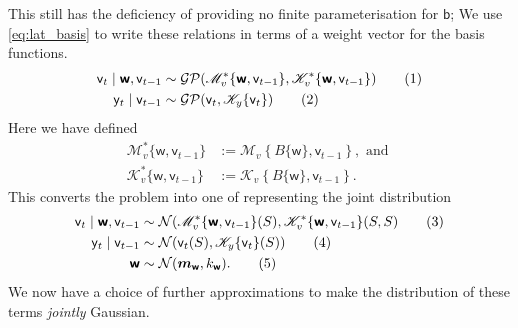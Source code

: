 \documentclass{article}
\newcommand\numberthis{\addtocounter{equation}{1}\tag{\theequation}}
\newcommand{\vv}[1]{\boldsymbol{#1}}
\newcommand{\rv}[1]{\mathsf{#1}}
\newcommand{\vrv}[1]{\vv{\rv{#1}}}
\newcommand{\dist}[1]{\mathcal{#1}}
\newcommand{\set}[1]{#1}
\newcommand{\op}[1]{\mathscr{#1}}
\newcommand{\gvn}{\mid}
\newcommand{\lat}{\rv{b}}   %
\newcommand{\latwt}{\vrv{w}}
\begin{document}

This still has the deficiency of providing no finite parameterisation for \(\lat\); We use \eqref{eq:lat_basis} to write these relations in terms of a weight vector for the basis functions.
\begin{align*}
\rv{v}_{t}\gvn \latwt,\rv{v}_{t-1}
&\sim \dist{GP}(\op{M}^*_v\{\latwt,\rv{v}_{t-1}\},\op{K}^*_{v}\{\latwt,\rv{v}_{t-1}\})\numberthis \label{eq:mvn_approx_proc} \\
\rv{y}_{t}\gvn \rv{v}_{t-1}
&\sim \dist{GP}(\rv{v}_{t},\op{K}_{y}\{\rv{v}_{t}\}) \numberthis \label{eq:mvn_approx_obs} \\
\end{align*}
Here we have defined
\begin{align*}
    \op{M}^*_v\{\latwt,\rv{v}_{t-1}\}&:=\op{M}_v\left\{B\{\latwt\},\rv{v}_{t-1}\right\}, \text{ and }\\ \op{K}^*_v\{\latwt,\rv{v}_{t-1}\}&:=\op{K}_v\left\{B\{\latwt\},\rv{v}_{t-1}\right\}.
\end{align*}
This converts the problem into one of representing the joint distribution
\begin{align*}
\rv{v}_{t}\gvn \latwt,\rv{v}_{t-1}
&\sim \dist{N}(\op{M}^*_v\{\latwt,\rv{v}_{t-1}\}(\set{S}),\op{K}^*_{v}\{\latwt,\rv{v}_{t-1}\}(\set{S},\set{S})
\numberthis \label{eq:mvn_approx_proc_fidi} \\
\rv{y}_{t}\gvn \rv{v}_{t-1}
&\sim \dist{N}(\rv{v}_{t}(\set{S}),\op{K}_{y}\{\rv{v}_{t}\}(\set{S}))
\numberthis \label{eq:mvn_approx_obs_fidi} \\
\latwt &\sim \dist{N}(\vv{m}_{\latwt},k_{\latwt}).
\numberthis \label{eq:mvn_approx_prior_fidi} 
\end{align*}
We now have a choice of further approximations to make the distribution of these terms \emph{jointly} Gaussian.
\end{document}
